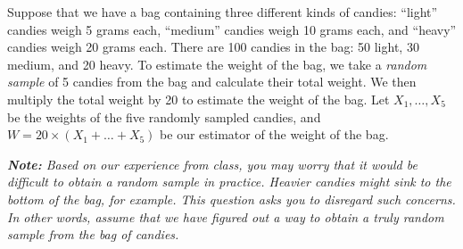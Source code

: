 \documentclass[addpoints,12pt]{exam}
\begin{document}
\begin{questions}


  \question Suppose that we have a bag containing three different kinds of candies: ``light'' candies weigh 5 grams each, ``medium'' candies weigh 10 grams each, and ``heavy'' candies weigh 20 grams each.
  There are 100 candies in the bag: 50 light, 30 medium, and 20 heavy.
  To estimate the weight of the bag, we take a \emph{random sample} of 5 candies from the bag and calculate their total weight.
  We then multiply the total weight by 20 to estimate the weight of the bag.
  Let $X_1, \dots, X_5$ be the weights of the five randomly sampled candies, and $W = 20 \times(X_1 + \dots + X_5)$ be our estimator of the weight of the bag.

  \emph{\textbf{Note:} Based on our experience from class, you may worry that it would be difficult to obtain a random sample in practice. 
  Heavier candies might sink to the bottom of the bag, for example.
  This question asks you to disregard such concerns. 
In other words, assume that we have figured out a way to obtain a truly random sample from the bag of candies.}
\begin{parts}

\end{parts}
\end{questions}
\end{document}
